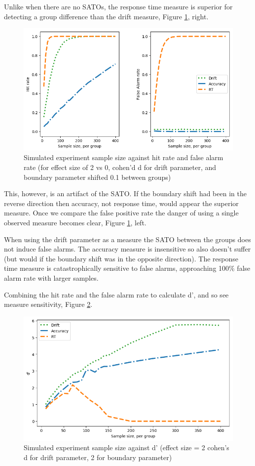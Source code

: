 \documentclass[floatsintext,doc]{apa6}
\theoremstyle{definition}
\theoremstyle{definition}
\theoremstyle{definition}
\theoremstyle{remark}
\begin{document}
Unlike when there are no SATOs, the response time measure is superior
for detecting a group difference than the drift measure, Figure
\ref{fig:SATO}, right.

\begin{figure}

{\centering \includegraphics[width=0.68\linewidth]{figs/SATO_hit_and_FA} 

}

\caption{Simulated experiment sample size against hit rate and false alarm rate (for effect size of 2 vs 0, cohen'd d for drift parameter, and boundary parameter shifted 0.1 between groups)}\label{fig:SATO}
\end{figure}

This, however, is an artifact of the SATO. If the boundary shift had
been in the reverse direction then accuracy, not response time, would
appear the superior measure. Once we compare the false positive rate the
danger of using a single observed measure becomes clear, Figure
\ref{fig:SATO}, left.

When using the drift parameter as a measure the SATO between the groups
does not induce false alarms. The accuracy measure is insensitive so
also doesn't suffer (but would if the boundary shift was in the opposite
direction). The response time measure is catastrophically sensitive to
false alarms, approaching 100\% false alarm rate with larger samples.

Combining the hit rate and the false alarm rate to calculate d', and so
see measure sensitivity, Figure \ref{fig:SATOdprime}.

\begin{figure}

{\centering \includegraphics[width=0.68\linewidth]{figs/SATO_dprime} 

}

\caption{Simulated experiment sample size against d' (effect size = 2 cohen's d for drift parameter, 2 for boundary parameter)}\label{fig:SATOdprime}
\end{figure}
\end{document}
